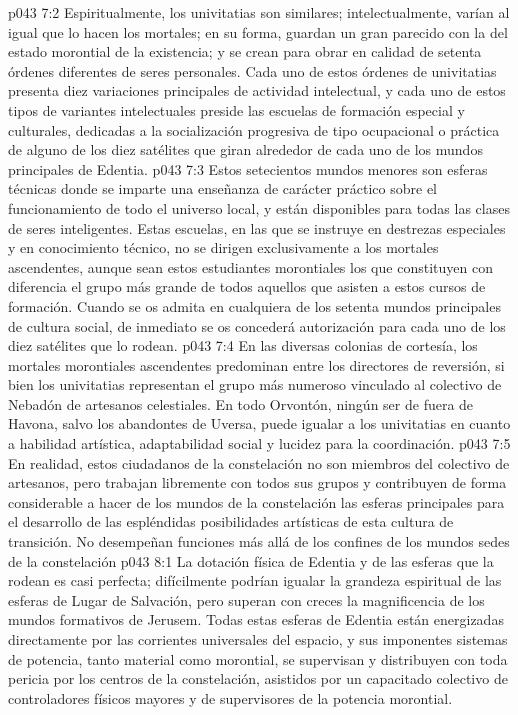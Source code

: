 \vs p043 7:2 Espiritualmente, los univitatias son similares; intelectualmente, varían al igual que lo hacen los mortales; en su forma, guardan un gran parecido con la del estado morontial de la existencia; y se crean para obrar en calidad de setenta órdenes diferentes de seres personales. Cada uno de estos órdenes de univitatias presenta diez variaciones principales de actividad intelectual, y cada uno de estos tipos de variantes intelectuales preside las escuelas de formación especial y culturales, dedicadas a la socialización progresiva de tipo ocupacional o práctica de alguno de los diez satélites que giran alrededor de cada uno de los mundos principales de Edentia.
\vs p043 7:3 Estos setecientos mundos menores son esferas técnicas donde se imparte una enseñanza de carácter práctico sobre el funcionamiento de todo el universo local, y están disponibles para todas las clases de seres inteligentes. Estas escuelas, en las que se instruye en destrezas especiales y en conocimiento técnico, no se dirigen exclusivamente a los mortales ascendentes, aunque sean estos estudiantes morontiales los que constituyen con diferencia el grupo más grande de todos aquellos que asisten a estos cursos de formación. Cuando se os admita en cualquiera de los setenta mundos principales de cultura social, de inmediato se os concederá autorización para cada uno de los diez satélites que lo rodean.
\vs p043 7:4 En las diversas colonias de cortesía, los mortales morontiales ascendentes predominan entre los directores de reversión, si bien los univitatias representan el grupo más numeroso vinculado al colectivo de Nebadón de artesanos celestiales. En todo Orvontón, ningún ser de fuera de Havona, salvo los abandontes de Uversa, puede igualar a los univitatias en cuanto a habilidad artística, adaptabilidad social y lucidez para la coordinación.
\vs p043 7:5 En realidad, estos ciudadanos de la constelación no son miembros del colectivo de artesanos, pero trabajan libremente con todos sus grupos y contribuyen de forma considerable a hacer de los mundos de la constelación las esferas principales para el desarrollo de las espléndidas posibilidades artísticas de esta cultura de transición. No desempeñan funciones más allá de los confines de los mundos sedes de la constelación
\vs p043 8:1 La dotación física de Edentia y de las esferas que la rodean es casi perfecta; difícilmente podrían igualar la grandeza espiritual de las esferas de Lugar de Salvación, pero superan con creces la magnificencia de los mundos formativos de Jerusem. Todas estas esferas de Edentia están energizadas directamente por las corrientes universales del espacio, y sus imponentes sistemas de potencia, tanto material como morontial, se supervisan y distribuyen con toda pericia por los centros de la constelación, asistidos por un capacitado colectivo de controladores físicos mayores y de supervisores de la potencia morontial.
